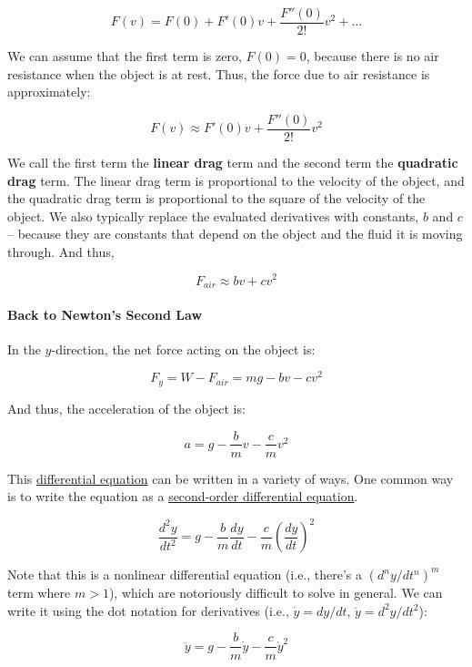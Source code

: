 \[F(v) = F(0) + F'(0)v + \frac{F''(0)}{2!}v^2 + \ldots\]

We can assume that the first term is zero, \(F(0)=0\), because there is
no air resistance when the object is at rest. Thus, the force due to air
resistance is approximately:

\[F(v) \approx F'(0)v + \frac{F''(0)}{2!}v^2\]

We call the first term the \textbf{linear drag} term and the second term
the \textbf{quadratic drag} term. The linear drag term is proportional
to the velocity of the object, and the quadratic drag term is
proportional to the square of the velocity of the object. We also
typically replace the evaluated derivatives with constants, \(b\) and
\(c\) -- because they are constants that depend on the object and the
fluid it is moving through. And thus,

\[F_{air} \approx bv + cv^2\]

\paragraph{Back to Newton's Second
Law}\label{back-to-newtons-second-law}

In the \(y\)-direction, the net force acting on the object is:

\[F_y = W - F_{air} = mg - bv - cv^2\]

And thus, the acceleration of the object is:

\[a = g - \frac{b}{m}v - \frac{c}{m}v^2\]

This
\href{(https://en.wikipedia.org/wiki/Differential_equation)}{differential
equation} can be written in a variety of ways. One common way is to
write the equation as a
\href{https://math.libretexts.org/Bookshelves/Differential_Equations/Introduction_to_Partial_Differential_Equations_(Herman)/12:_B_-_Ordinary_Differential_Equations_Review/12.02:_Second_Order_Linear_Differential_Equations}{second-order
differential equation}.

\[\frac{d^2y}{dt^2} = g - \frac{b}{m}\frac{dy}{dt} - \frac{c}{m}\left(\frac{dy}{dt}\right)^2\]

Note that this is a nonlinear differential equation (i.e., there's a
\((d^ny/dt^n)^m\) term where \(m > 1\)), which are notoriously difficult
to solve in general. We can write it using the dot notation for
derivatives (i.e., \(\dot{y} = dy/dt\), \(\ddot{y} = d^2y/dt^2\)):

\[\ddot{y} = g - \frac{b}{m}\dot{y} - \frac{c}{m}\dot{y}^2\]

